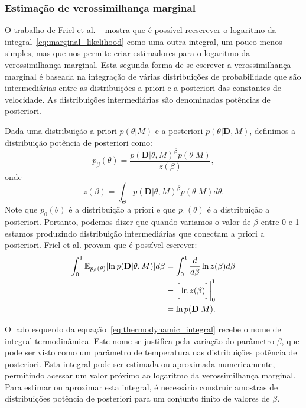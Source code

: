 \documentclass[12pt]{article}
\newcommand{\expectation}{\mathbb{E}}
\begin{document}
\subsubsection{Estimação de verossimilhança marginal}
O trabalho de Friel et al. ~\cite{Friel2008} mostra que é possível
reescrever o logaritmo da integral~\ref{eq:marginal_likelihood} como uma 
outra integral, um pouco menos simples, mas que nos permite criar 
estimadores para o logaritmo da verossimilhança marginal. Esta segunda 
forma de se escrever a verossimilhança marginal é baseada na integração 
de várias distribuições de probabilidade que são intermediárias entre as 
distribuições a priori e a posteriori das constantes de velocidade. As 
distribuições intermediárias são denominadas potências de posteriori.

Dada uma distribuição a priori $p (\theta | M)$ e a posteriori $p
(\theta | \mathbf{D}, M)$, definimos a distribuição potência de
posteriori como:
\begin{equation*}
    p_{\beta} (\theta) = \frac{p (\mathbf{D} | \theta, M)^\beta 
        p(\theta | M)}{z (\beta)},
\end{equation*}
onde
\begin{equation*}
    z (\beta) = \int_\Theta p (\mathbf{D} | \theta, M)^\beta 
        p(\theta | M) d\theta.
\end{equation*}
Note que $p_{0} (\theta)$ é a distribuição a priori e que $p_{1}
(\theta)$ é a distribuição a posteriori. Portanto, podemos dizer que
quando variamos o valor de $\beta$ entre 0 e 1 estamos produzindo
distribuição intermediárias que conectam a priori a posteriori. Friel et
al. provam que é possível escrever:
\begin{align}
    \int_0^1 \expectation_{p_\beta (\theta)} 
        [\ln p(\mathbf{D}|\theta, M)]d\beta 
    &= \int_0^1 \frac{d}{d\beta} \ln z(\beta) d\beta \notag \\
    &= \Big[\ln z(\beta)\Big]\bigg\rvert^1_0 \notag \\
    &= \ln p (\mathbf{D} | M).
    \label{eq:thermodynamic_integral}
\end{align}

O lado esquerdo da equação~\ref{eq:thermodynamic_integral} recebe o nome 
de integral termodinâmica. Este nome se justifica pela variação do
parâmetro $\beta$, que pode ser visto como um parâmetro de temperatura
nas distribuições potência de posteriori. Esta integral pode ser
estimada ou aproximada numericamente, permitindo acessar um valor 
próximo ao logaritmo da verossimilhança marginal. Para estimar ou
aproximar esta integral, é necessário construir amostras de
distribuições potência de posteriori para um conjunto finito de valores
de $\beta$.
\end{document}
